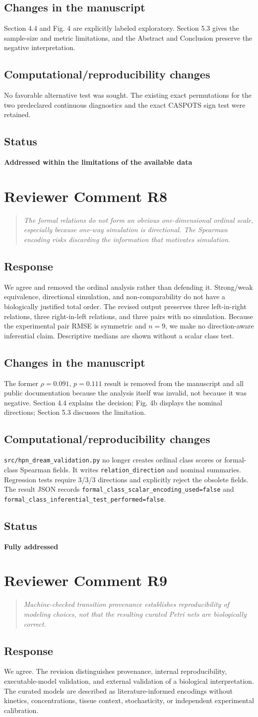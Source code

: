 \documentclass[11pt]{article}
\newcommand{\reviewcomment}[2]{%
  \section*{Reviewer Comment #1}
  \begin{quote}\itshape #2\end{quote}}
\newcommand{\response}{\subsection*{Response}}
\newcommand{\manuscriptchanges}{\subsection*{Changes in the manuscript}}
\newcommand{\computationalchanges}{\subsection*{Computational/reproducibility changes}}
\newcommand{\status}[1]{\subsection*{Status}\textbf{#1}}
\begin{document}
\manuscriptchanges
Section 4.4 and Fig. 4 are explicitly labeled exploratory. Section 5.3 gives the
sample-size and metric limitations, and the Abstract and Conclusion preserve the
negative interpretation.

\computationalchanges
No favorable alternative test was sought. The existing exact permutations for
the two predeclared continuous diagnostics and the exact CASPOTS sign test were
retained.

\status{Addressed within the limitations of the available data}

\reviewcomment{R8}{The formal relations do not form an obvious one-dimensional
ordinal scale, especially because one-way simulation is directional. The
Spearman encoding risks discarding the information that motivates simulation.}

\response
We agree and removed the ordinal analysis rather than defending it. Strong/weak
equivalence, directional simulation, and non-comparability do not have a
biologically justified total order. The revised output preserves three
left-in-right relations, three right-in-left relations, and three pairs with no
simulation. Because the experimental pair RMSE is symmetric and $n=9$, we make
no direction-aware inferential claim. Descriptive medians are shown without a
scalar class test.

\manuscriptchanges
The former $\rho=0.091$, $p=0.111$ result is removed from the manuscript and all
public documentation because the analysis itself was invalid, not because it
was negative. Section 4.4 explains the decision; Fig. 4b displays the nominal
directions; Section 5.3 discusses the limitation.

\computationalchanges
\nolinkurl{src/hpn_dream_validation.py} no longer creates ordinal class scores or
formal-class Spearman fields. It writes \nolinkurl{relation_direction} and
nominal summaries. Regression tests require 3/3/3 directions and explicitly
reject the obsolete fields. The result JSON records
\nolinkurl{formal_class_scalar_encoding_used=false} and
\nolinkurl{formal_class_inferential_test_performed=false}.

\status{Fully addressed}

\reviewcomment{R9}{Machine-checked transition provenance establishes
reproducibility of modeling choices, not that the resulting curated Petri nets
are biologically correct.}

\response
We agree. The revision distinguishes provenance, internal reproducibility,
executable-model validation, and external validation of a biological
interpretation. The curated models are described as literature-informed
encodings without kinetics, concentrations, tissue context, stochasticity, or
independent experimental calibration.
\end{document}
